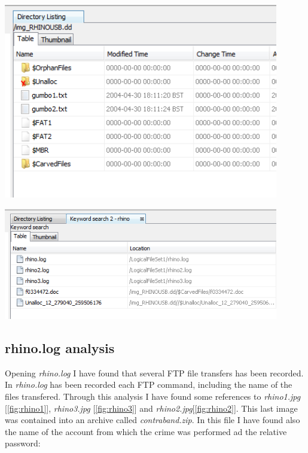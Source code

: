 \documentclass{article}
\begin{document}
\begin{minipage}[t]{0.45\textwidth}
	\centering
	\vspace{0.5cm}
	\includegraphics[width=0.9\textwidth]{img/rhinousb_root.png}
	\vspace{1cm}
	\label{fig:rhino_root}
\end{minipage}
\hspace{0.5cm}
\begin{minipage}[t]{0.45\textwidth}
	\centering
	\vspace{0.5cm}
	\includegraphics[width=0.9\textwidth]{img/rhino_search.png}
	\vspace{1cm}
	\label{fig:rhino_search}
\end{minipage}

\subsection{rhino.log analysis}
Opening \textit{rhino.log} I have found that several FTP file transfers has been recorded.
In \textit{rhino.log} has been recorded each FTP command, including the name of the files transfered.
Through this analysis I have found some references to \textit{rhino1.jpg} [\autoref{fig:rhino1}], \textit{rhino3.jpg} [\autoref{fig:rhino3}] and \textit{rhino2.jpg}[\autoref{fig:rhino2}].
This last image was contained into an archive called \textit{contraband.zip}.
In this file I have found also the name of the account from which the crime was performed ad the relative password:
\end{document}
